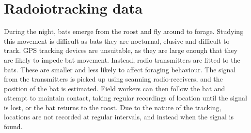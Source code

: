 \section{Radoiotracking data}

During the night, bats emerge from the roost and fly around to forage. Studying this movement is difficult as bats they are nocturnal, elusive and difficult to track. GPS tracking devices are unsuitable, as they are large enough that they are likely to impede bat movement. Instead, radio transmitters are fitted to the bats. These are smaller and less likely to affect foraging behaviour. The signal from the transmitters is picked up using scanning radio-receivers, and the position of the bat is estimated. Field workers can then follow the bat and attempt to maintain contact, taking regular recordings of location until the signal is lost, or the bat returns to the roost. Due to the nature of the tracking, locations are not recorded at regular intervals, and instead when the signal is found.

